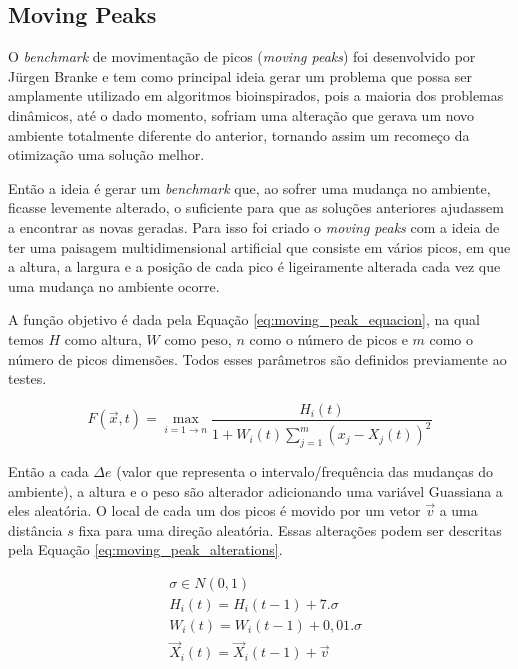 \subsection{Moving Peaks}
\label{sec:moving_peaks}

O \textit{benchmark} de movimentação de picos (\textit{moving peaks}) foi desenvolvido por Jürgen Branke \cite{moving_peak_1999} e tem como principal ideia gerar um problema que possa ser amplamente utilizado em algoritmos bioinspirados, pois a maioria dos problemas dinâmicos, até o dado momento, sofriam uma alteração que gerava um novo ambiente totalmente diferente do anterior, tornando assim um recomeço da otimização uma solução melhor.

Então a ideia é gerar um \textit{benchmark} que, ao sofrer uma mudança no ambiente, ficasse levemente alterado, o suficiente para que as soluções anteriores ajudassem a encontrar as novas geradas. Para isso foi criado o \textit{moving peaks} com a ideia de ter uma paisagem multidimensional artificial que consiste em vários picos, em que a altura, a largura e a posição de cada pico é ligeiramente alterada cada vez que uma mudança no ambiente ocorre.

A função objetivo é dada pela Equação \ref{eq:moving_peak_equacion}, na qual temos $ H $ como altura, $ W $ como peso, $ n $ como o número de picos e $ m $ como o número de picos dimensões. Todos esses parâmetros são definidos previamente ao testes.

\begin{equation}
\label{eq:moving_peak_equacion}
F(\vec{x},t) = \max_{i = 1 \to n} \frac {H_i(t)}{1 + W_i(t)\sum_{j=1}^{m} (x_j - X_j(t))^2}
\end{equation}

Então a cada $\Delta e$ (valor que representa o intervalo/frequência das mudanças do ambiente), a altura e o peso são alterador adicionando uma variável Guassiana a eles aleatória. O local de cada um dos picos é movido por um vetor $\vec{v}$ a uma distância $ s $ fixa para uma direção aleatória. Essas alterações podem ser descritas pela Equação \ref{eq:moving_peak_alterations}.

\begin{equation}
\label{eq:moving_peak_alterations}
\begin{split}
& \sigma \in N(0,1) \\
& H_i(t) = H_i(t-1) + 7.\sigma \\
& W_i(t) = W_i(t-1) + 0,01.\sigma \\
& \vec{X}_i(t) = \vec{X}_i(t-1)+\vec{v}
\end{split}
\end{equation}


